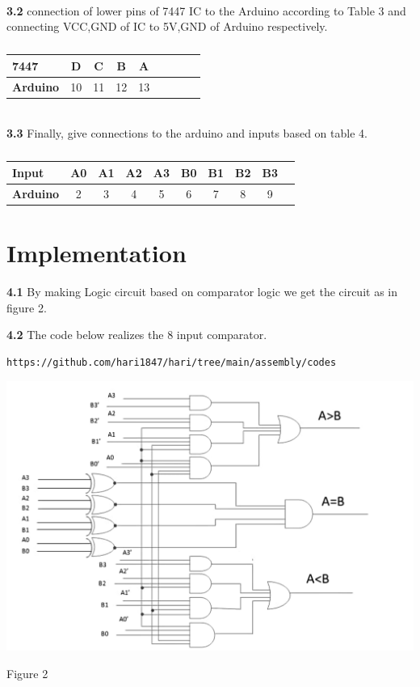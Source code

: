 \documentclass[10pt, a4paper]{article}
\begin{document}
\\	\textbf{3.2}
	connection of lower pins of 7447 IC to the Arduino according to Table 3 and connecting VCC,GND of IC to 5V,GND of Arduino respectively.
		\begin{table}[htbp]
    \begin{center}
    \begin{tabular}{|l|c|c|c|c|c|c|c|c} \hline \textbf{7447}
  & D & C & B & A \\
 \hline
\textbf{Arduino} & 10 & 11 & 12& 13\\ \hline
\end{tabular}   
\end{center}
\caption{\label{table:dummytable} }
\end{table}
\\\textbf{3.3}
Finally, give connections to the arduino and inputs based on table 4.
	\begin{table}[htbp]
    \begin{center}
    \begin{tabular}{|l|c|c|c|c|c|c|c|c|c|} \hline 
 
\textbf{Input} & A0 & A1 & A2 & A3 & B0 & B1 & B2&B3 \\ \hline
\textbf{Arduino} & 2 & 3 & 4 & 5& 6 & 7 & 8 & 9\\ \hline
\end{tabular}   
\end{center}
\caption{\label{table:dummytable} }
\end{table}
\section{Implementation}
\textbf{4.1}
By making Logic circuit based on comparator logic we get the circuit as in figure 2.

\textbf{4.2}
The code below realizes the 8 input comparator.
\begin{lstlisting}
https://github.com/hari1847/hari/tree/main/assembly/codes
\end{lstlisting}



 \begin{center}
\includegraphics[scale=.10]{circuit.jpeg}

\end{center}
\begin{center}
    Figure 2
\end{center}
\end{document}

